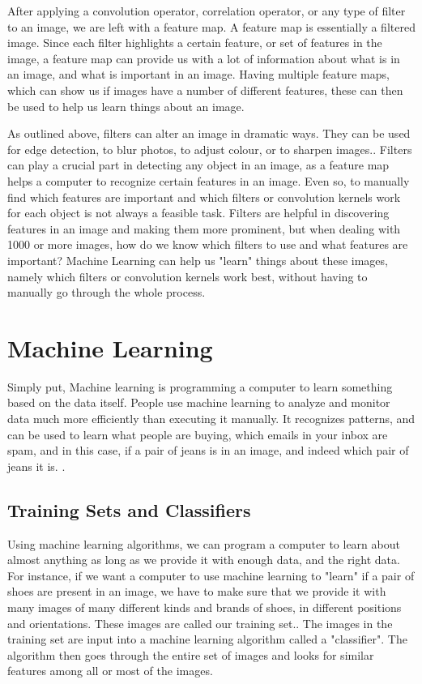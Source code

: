 \documentclass[12pt]{report} %
\begin{document}
	 After applying a convolution operator, correlation operator, or any type of filter to an image, we are left with a feature map. A feature map is essentially a filtered image. Since each filter highlights a certain feature, or set of features in the image, a feature map can provide us with a lot of information about what is in an image, and what is important in an image\cite{aurelienMachineLearning}. Having multiple feature maps, which can show us if images have a number of different features, these can then be used to help us learn things about an image.
	
	As outlined above, filters can alter an image in dramatic ways. They can be used for edge detection, to blur photos, to adjust colour, or to sharpen images.\cite{szeliski2010computer}. Filters can play a crucial part in detecting any object in an image, as a feature map helps a computer to recognize certain features in an image. Even so, to manually find which features are important and which filters or convolution kernels work for each object is not always a feasible task. Filters are helpful in discovering features in an image and making them more prominent, but when dealing with 1000 or more images, how do we know which filters to use and what features are important? Machine Learning can help us "learn" things about these images, namely which filters or convolution kernels work best, without having to manually go through the whole process. 

\chapter{Machine Learning}
	Simply put, Machine learning is programming a computer to learn something based on the data itself. People use machine learning to analyze and monitor data much more efficiently than executing it manually. It recognizes patterns, and can be used to learn what people are buying, which emails in your inbox are spam, and in this case, if a pair of jeans is in an image, and indeed which pair of jeans it is. \cite{aurelienMachineLearning}. 

\section{Training Sets and Classifiers}
	Using machine learning algorithms, we can program a computer to learn about almost anything as long as we provide it with enough data, and the right data. For instance, if we want a computer to use machine learning to "learn" if a pair of shoes are present in an image, we have to make sure that we provide it with many images of many different kinds and brands of shoes, in different positions and orientations. These images are called our training set.\cite{aurelienMachineLearning}. The images in the training set are input into a machine learning algorithm called a "classifier"\cite{KubatMachineLearn}. The algorithm then goes through the entire set of images and looks for similar features among all or most of the images. 
	
\end{document}
